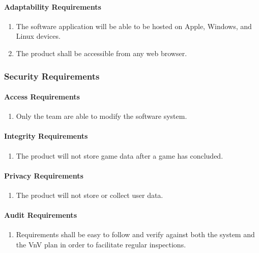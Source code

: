 \documentclass[12pt]{article}
\begin{document}
\paragraph{Adaptability Requirements}
\begin{enumerate}[{MS}1., leftmargin=2\parindent, resume]
    \item The software application will be able to be hosted on Apple, Windows, and Linux devices.
    \item The product shall be accessible from any web browser.
\end{enumerate}



\subsubsection{Security Requirements}
\label{NFR_SR}
\paragraph{Access Requirements}
\begin{enumerate}[{SR}1., leftmargin=2\parindent]
    \item Only the \progname{} team are able to modify the software system.
\end{enumerate}

\paragraph{Integrity Requirements}
\begin{enumerate}[{SR}1., leftmargin=2\parindent, resume]
    \item The product will not store game data after a game has concluded.
\end{enumerate}

\paragraph{Privacy Requirements}
\begin{enumerate}[{SR}1., leftmargin=2\parindent, resume]
    \item The product will not store or collect user data.
\end{enumerate}

\paragraph{Audit Requirements}
\begin{enumerate}[{SR}1., leftmargin=2\parindent, resume]
    \item Requirements shall be easy to follow and verify against both the system and the VnV plan in order to facilitate regular inspections.
\end{enumerate}
\end{document}
